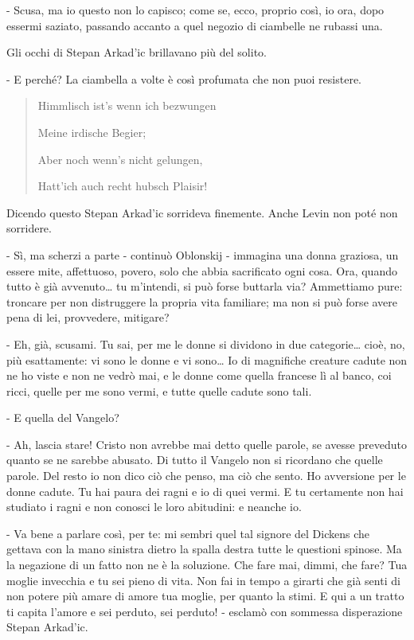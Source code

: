 - Scusa, ma io questo non lo capisco; come se, ecco, proprio così, io ora, dopo essermi saziato, passando accanto a quel negozio di ciambelle ne rubassi una. 

Gli occhi di Stepan Arkad'ic brillavano più del solito. 

- E perché? La ciambella a volte è così profumata che non puoi resistere. 

\begin{quote}
Himmlisch ist's wenn ich bezwungen

Meine irdische Begier; 

Aber noch wenn's nicht gelungen, 

Hatt'ich auch recht hubsch Plaisir!
\end{quote} 

Dicendo questo Stepan Arkad'ic sorrideva finemente. Anche Levin non poté non sorridere. 

- Sì, ma scherzi a parte - continuò Oblonskij - immagina una donna graziosa, un essere mite, affettuoso, povero, solo che abbia sacrificato ogni cosa. Ora, quando tutto è già avvenuto\ldots{} tu m'intendi, si può forse buttarla via? Ammettiamo pure: troncare per non distruggere la propria vita familiare; ma non si può forse avere pena di lei, provvedere, mitigare? 

- Eh, già, scusami. Tu sai, per me le donne si dividono in due categorie\ldots{} cioè, no, più esattamente: vi sono le donne e vi sono\ldots{} Io di magnifiche creature cadute non ne ho viste e non ne vedrò mai, e le donne come quella francese lì al banco, coi ricci, quelle per me sono vermi, e tutte quelle cadute sono tali. 

- E quella del Vangelo? 

- Ah, lascia stare! Cristo non avrebbe mai detto quelle parole, se avesse preveduto quanto se ne sarebbe abusato. Di tutto il Vangelo non si ricordano che quelle parole. Del resto io non dico ciò che penso, ma ciò che sento. Ho avversione per le donne cadute. Tu hai paura dei ragni e io di quei vermi. E tu certamente non hai studiato i ragni e non conosci le loro abitudini: e neanche io. 

- Va bene a parlare così, per te: mi sembri quel tal signore del Dickens che gettava con la mano sinistra dietro la spalla destra tutte le questioni spinose. Ma la negazione di un fatto non ne è la soluzione. Che fare mai, dimmi, che fare? Tua moglie invecchia e tu sei pieno di vita. Non fai in tempo a girarti che già senti di non potere più amare di amore tua moglie, per quanto la stimi. E qui a un tratto ti capita l'amore e sei perduto, sei perduto! - esclamò con sommessa disperazione Stepan Arkad'ic. 

